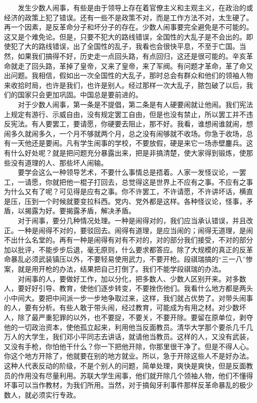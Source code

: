 \documentclass[cn,11pt,chinese]{elegantbook}
\begin{document}
　　发生少数人闹事，有些是由于领导上存在着官僚主义和主观主义，在政治的或经济的政策上犯了错误。还有一些不是政策不对，而是工作方法不对，太生硬了。再一个因素，是反革命分子和坏分子的存在。少数人闹事要完全避免是不可能的。这又是个难免论。但是，只要不犯大的路线错误，全国性的大乱子是不会出的。即使犯了大的路线错误，出了全国性的乱子，我看也会很快平息，不至于亡国。当然，如果我们搞得不好，历史走一点回头路，有点回归，这还是很可能的。辛亥革命就走了回头路，革掉了皇帝，又来了皇帝，来了军阀。有问题才革命，革了命又出问题。我相信，假如出一次全国性的大乱子，那时总会有群众和他们的领袖人物来收拾时局，也许是我们，也许是别人。经过那样一次大乱子，脓包破了以后，我们的国家只会更加巩固。中国总是要前进的。\\
　　对于少数人闹事，第一条是不提倡，第二条是有人硬要闹就让他闹。我们宪法上规定有游行、示威自由，没有规定罢工自由，但是也没有禁止，所以罢工并不违反宪法。有人要罢工，要请愿，你硬要去阻止，那不好。我看，谁想闹谁就闹，想闹多久就闹多久，一个月不够就两个月，总之没有闹够就不收场。你急于收场，总有一天他还是要闹。凡有学生闹事的学校，不要放假，硬是来它一场赤壁鏖兵。这有什么好处呢？就是把问题充分暴露出来，把是非搞清楚，使大家得到锻炼，使那些没有道理的人、那些坏人闹输。\\
　　要学会这么一种领导艺术，不要什么事情总是捂着。人家一发怪议论，一罢工，一请愿，你就把他一棍子打回去，总觉得这是世界上不应有之事。不应有之事为什么又有了呢？可见得是应有之事。你不许罢工，不许请愿，不许讲坏话，横直是压，压到一个时候就要变拉科西。党内、党外都是这样。各种怪议论，怪事，矛盾，以揭露为好。要揭露矛盾，解决矛盾。\\
　　对于闹事，要分几种情况处理。一种是闹得对的，我们应当承认错误，并且改正。一种是闹得不对的，要驳回去。闹得有道理，是应当闹的；闹得无道理，是闹不出什么名堂的。再有一种是闹得有对有不对的，对的部分我们接受，不对的部分加以批评，不能步步后退，毫无原则，什么要求都答应。除了大规模的真正的反革命暴乱必须武装镇压以外，不要轻易使用武力，不要开枪。段祺瑞搞的“三一八”惨案，就是用开枪的办法，结果把自己打倒了。我们不能学段祺瑞的办法。\\
　　对闹事的人，要做好工作，加以分化，把多数人、少数人区别开来。对多数人，要好好引导、教育，使他们逐步转变，不要挫伤他们。我看什么地方都是两头小中间大。要把中间派一步一步地争取过来，这样，我们就占优势了。对带头闹事的人，要有分析。有些人敢于带头闹，经过教育，可能成为有用之材。对少数坏人，除了最严重犯罪的以外，也不要捉，不要关，不要开除。要留在原单位，剥夺他的一切政治资本，使他孤立起来，利用他当反面教员。清华大学那个要杀几千几万人的大学生，我们邓小平同志去讲话，就请他当教员。这样的人，又没有武装，又没有手枪，你怕他干什么？你一下把他开除，你那里很干净了。但是不得人心。你这个地方开除了，他就要在别的地方就业。所以，急于开除这些人不是好办法。这种人代表反动的阶级，不是个别人的问题，简单处理，爽快是爽快，但是反面教员的作用没有尽量利用。苏联大学生闹事，他们就开除几个领袖人物，他们不懂得坏事可以当作教材，为我们所用。当然，对于搞匈牙利事件那样反革命暴乱的极少数人，就必须实行专政。\\
\end{document}
